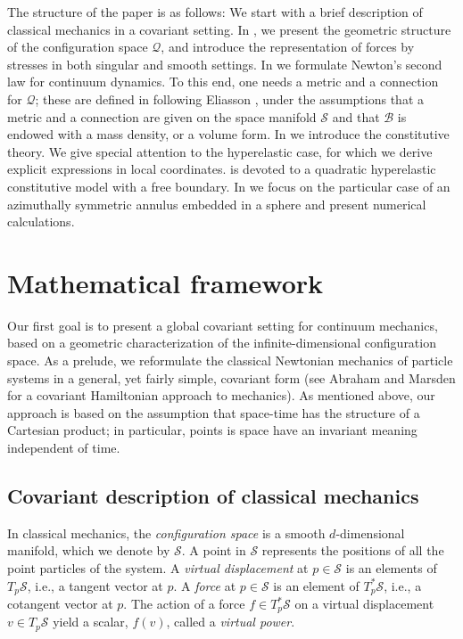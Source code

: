 \documentclass[smallextended]{svjour3}
\begin{document}
The structure of the paper is as follows:
We start  with a brief description of classical mechanics in a covariant setting. 
In , we present the geometric structure of the configuration space ${\mathcal{Q}}$, and introduce the representation of forces by stresses in both singular and smooth settings. 
In  we formulate Newton's second law for continuum dynamics. To this end, one needs  a metric and a connection for ${\mathcal{Q}}$; these are defined in  following Eliasson \cite{Eli67}, under the assumptions that a metric and a connection are given on the space manifold ${\mathcal{S}}$ and that  ${\mathcal{B}}$ is endowed with a mass density, or a volume form. 
In  we introduce the constitutive theory. We give special attention to the hyperelastic case, for which we derive explicit expressions in local coordinates. 
 is devoted to a quadratic hyperelastic constitutive model with a free boundary. In  we focus on the particular case of an azimuthally symmetric annulus embedded in a sphere and present numerical calculations.

\section{Mathematical framework}\label{sec:mathframework}

Our first goal is to  present a global covariant setting for continuum mechanics, based on a geometric characterization of the infinite-dimensional configuration space.  As a prelude, we reformulate the classical Newtonian mechanics of particle systems in a general, yet fairly simple, covariant form (see Abraham and Marsden \cite{AM87} for a covariant Hamiltonian approach to mechanics).  As mentioned above, our approach is based on the assumption that space-time has the structure of a Cartesian product; in particular, points is space have an invariant meaning independent of time.

\subsection{Covariant description of classical mechanics}

In classical mechanics, the \emph{configuration space} is a smooth $d$-dimensional manifold, which we denote by ${\mathcal{S}}$. A point in ${\mathcal{S}}$ represents the positions of all the point particles of the system. A \emph{virtual displacement} at $p\in {\mathcal{S}}$ is an elements of $T_p{\mathcal{S}}$, i.e., a tangent vector at $p$. A \emph{force} at $p\in {\mathcal{S}}$ is an element of $T_p^*{\mathcal{S}}$, i.e., a cotangent vector at $p$. The action of a force $f\in T_p^*{\mathcal{S}}$ on a virtual displacement $v\in T_p{\mathcal{S}}$ yield a scalar, $f(v)$, called a \emph{virtual power}.
\end{document}
